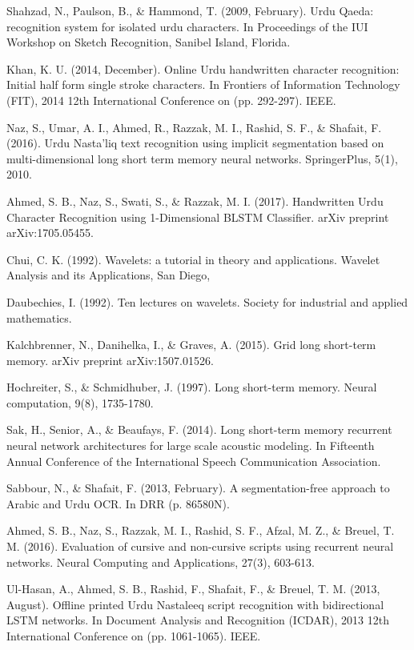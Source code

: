 \documentclass[a4paper,conference]{IEEEtran}
\begin{document}
\begin{thebibliography}{130}
Shahzad, N., Paulson, B., \& Hammond, T. (2009, February). Urdu Qaeda: recognition system for isolated urdu characters. In Proceedings of the IUI Workshop on Sketch Recognition, Sanibel Island, Florida.

Khan, K. U. (2014, December). Online Urdu handwritten character recognition: Initial half form single stroke characters. In Frontiers of Information Technology (FIT), 2014 12th International Conference on (pp. 292-297). IEEE.

Naz, S., Umar, A. I., Ahmed, R., Razzak, M. I., Rashid, S. F., \& Shafait, F. (2016). Urdu Nasta’liq text recognition using implicit segmentation based on multi-dimensional long short term memory neural networks. SpringerPlus, 5(1), 2010.

Ahmed, S. B., Naz, S., Swati, S., \& Razzak, M. I. (2017). Handwritten Urdu Character Recognition using 1-Dimensional BLSTM Classifier. arXiv preprint arXiv:1705.05455.

Chui, C. K. (1992). Wavelets: a tutorial in theory and applications. Wavelet Analysis and its Applications, San Diego,

Daubechies, I. (1992). Ten lectures on wavelets. Society for industrial and applied mathematics.

Kalchbrenner, N., Danihelka, I., \& Graves, A. (2015). Grid long short-term memory.  arXiv preprint arXiv:1507.01526.

Hochreiter, S., \& Schmidhuber, J. (1997). Long short-term memory.  Neural computation, 9(8), 1735-1780.

Sak, H., Senior, A., \& Beaufays, F. (2014). Long short-term memory recurrent neural network architectures for large scale acoustic modeling. In Fifteenth Annual Conference of the International Speech Communication Association.

Sabbour, N., \& Shafait, F. (2013, February). A segmentation-free approach to Arabic and Urdu OCR. In DRR (p. 86580N).

Ahmed, S. B., Naz, S., Razzak, M. I., Rashid, S. F., Afzal, M. Z., \& Breuel, T. M. (2016). Evaluation of cursive and non-cursive scripts using recurrent neural networks. Neural Computing and Applications, 27(3), 603-613.

Ul-Hasan, A., Ahmed, S. B., Rashid, F., Shafait, F., \& Breuel, T. M. (2013, August). Offline printed Urdu Nastaleeq script recognition with bidirectional LSTM networks. In Document Analysis and Recognition (ICDAR), 2013 12th International Conference on (pp. 1061-1065). IEEE.


\end{thebibliography}
\end{document}
